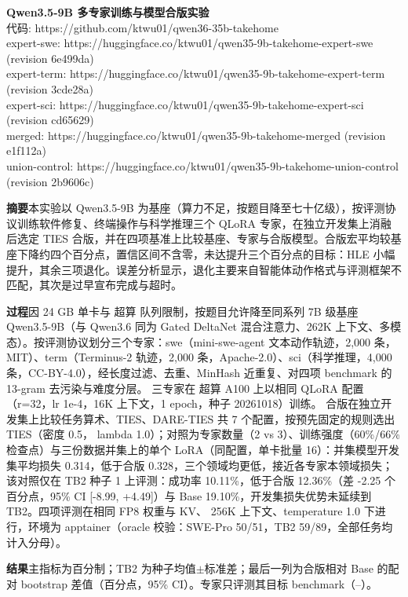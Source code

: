 \documentclass[9pt]{extarticle}
\begin{document}
{\large\bfseries Qwen3.5-9B 多专家训练与模型合版实验}\\[2pt]
{\small 代码: https://github.com/ktwu01/qwen36-35b-takehome}\\
{\footnotesize expert-swe: https://huggingface.co/ktwu01/qwen35-9b-takehome-expert-swe (revision 6e499da) \\ expert-term: https://huggingface.co/ktwu01/qwen35-9b-takehome-expert-term (revision 3cde28a) \\ expert-sci: https://huggingface.co/ktwu01/qwen35-9b-takehome-expert-sci (revision cd65629) \\ merged: https://huggingface.co/ktwu01/qwen35-9b-takehome-merged (revision e1f112a) \\ union-control: https://huggingface.co/ktwu01/qwen35-9b-takehome-union-control (revision 2b9606c)}

\textbf{摘要}\quad 本实验以 Qwen3.5-9B 为基座（算力不足，按题目降至七十亿级），按评测协议训练软件修复、终端操作与科学推理三个 QLoRA 专家，在独立开发集上消融后选定 TIES 合版，并在四项基准上比较基座、专家与合版模型。合版宏平均较基座下降约四个百分点，置信区间不含零，未达提升三个百分点的目标：HLE 小幅提升，其余三项退化。误差分析显示，退化主要来自智能体动作格式与评测框架不匹配，其次是过早宣布完成与超时。

\textbf{过程}\quad 因 24 GB 单卡与 超算 队列限制，按题目允许降至同系列 7B 级基座 Qwen3.5-9B（与 Qwen3.6 同为 Gated DeltaNet 混合注意力、262K 上下文、多模态）。按评测协议划分三个专家：swe（mini-swe-agent 文本动作轨迹，2,000 条，MIT）、term（Terminus-2 轨迹，2,000 条，Apache-2.0）、sci（科学推理，4,000 条，CC-BY-4.0），经长度过滤、去重、MinHash 近重复、对四项 benchmark 的 13-gram 去污染与难度分层。 三专家在 超算 A100 上以相同 QLoRA 配置（r=32，lr 1e-4，16K 上下文，1 epoch，种子 20261018）训练。 合版在独立开发集上比较任务算术、TIES、DARE-TIES 共 7 个配置，按预先固定的规则选出 TIES（密度 0.5， lambda 1.0）；对照为专家数量（2 vs 3）、训练强度（60\%/66\% 检查点）与三份数据并集上的单个 LoRA（同配置，单卡批量 16）：并集模型开发集平均损失 0.314，低于合版 0.328，三个领域均更低，接近各专家本领域损失；该对照仅在 TB2 种子 1 上评测：成功率 10.11\%，低于合版 12.36\%（差 -2.25 个百分点，95\% CI [-8.99, +4.49]）与 Base 19.10\%，开发集损失优势未延续到 TB2。四项评测在相同 FP8 权重与 KV、 256K 上下文、temperature 1.0 下进行，环境为 apptainer（oracle 校验：SWE-Pro 50/51，TB2 59/89，全部任务均计入分母）。

\textbf{结果}\quad 主指标为百分制；TB2 为种子均值$\pm$标准差；最后一列为合版相对 Base 的配对 bootstrap 差值（百分点，95\% CI）。专家只评测其目标 benchmark（--）。
\end{document}
